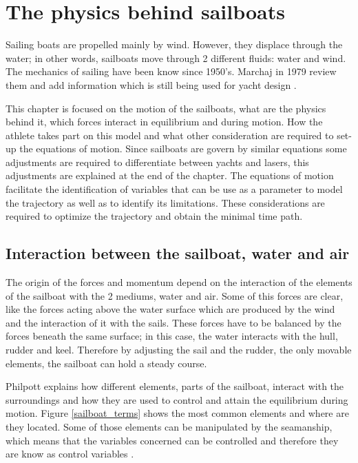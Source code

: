 \chapter{The physics behind sailboats}

Sailing boats are propelled mainly by wind. However, they displace through the water; in other words, sailboats move through 2 different fluids: water and wind. The mechanics of sailing have been know since 1950's.  Marchaj in 1979 review them and add information which is still being used for yacht design \cite{marchajaereo1979}.\par 

This chapter is focused on the motion of the sailboats, what are the physics behind it, which forces interact in equilibrium and during motion. How the athlete takes part on this model and what other consideration are required to set-up the equations of motion. Since sailboats are govern by similar equations some adjustments are required to differentiate between yachts and lasers, this adjustments are explained at the end of the chapter. The equations of motion facilitate the identification of variables that can be use as a parameter to model the trajectory as well as to identify its limitations. These considerations are required to optimize the trajectory and obtain the minimal time path. \par
\section{Interaction between the sailboat, water and air} \label{sec:interaction_boat_environ}
The origin of the forces and momentum depend on the interaction of the elements of the sailboat with the 2 mediums, water and air. Some of this forces are clear, like the forces acting above the water surface which are produced by the wind and the interaction of it with the sails. These forces have to be balanced by the forces beneath the same surface; in this case, the water interacts with the hull, rudder and keel. Therefore by adjusting the sail and the rudder, the only movable elements, the sailboat can hold a steady course.\par

Philpott explains how different elements, parts of the sailboat, interact with the surroundings and how they are used to control and attain the equilibrium during motion. Figure \ref{sailboat_terms} shows the most common elements and where are they located. Some of those elements can be manipulated by the seamanship, which means that the variables concerned can be controlled and therefore they are know as control variables \cite{philpott1993yacht}. \par

